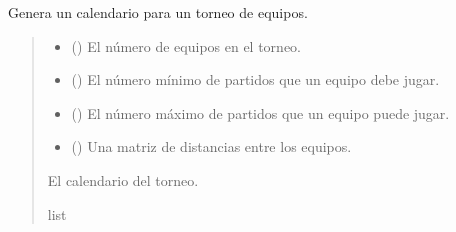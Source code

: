 \documentclass[letterpaper,10pt,spanish]{sphinxmanual}
\begin{document}

\begin{fulllineitems}
\label{\detokenize{Funcionales:Funcionales.calendario.generar_calendario}}
\pysigstartsignatures
{}
\pysigstopsignatures
\sphinxAtStartPar
Genera un calendario para un torneo de equipos.
\begin{quote}\begin{description}
\begin{itemize}
\item {} 
\sphinxAtStartPar
{} () \textendash{} El número de equipos en el torneo.

\item {} 
\sphinxAtStartPar
{} () \textendash{} El número mínimo de partidos que un equipo debe jugar.

\item {} 
\sphinxAtStartPar
{} () \textendash{} El número máximo de partidos que un equipo puede jugar.

\item {} 
\sphinxAtStartPar
{} () \textendash{} Una matriz de distancias entre los equipos.

\end{itemize}

\sphinxAtStartPar
El calendario del torneo.

\sphinxAtStartPar
list

\end{description}\end{quote}

\end{fulllineitems}
\end{document}
